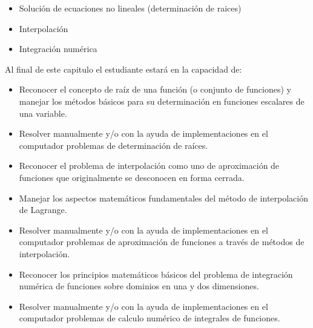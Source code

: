 \begin{itemize}
	\item Solución de ecuaciones no lineales (determinación de raices)
	\item Interpolación
	\item Integración numérica
\end{itemize}

Al final de este capitulo el estudiante estará en la capacidad de:

\begin{itemize}
	\item Reconocer el concepto de raíz de una función (o conjunto de funciones) y manejar los métodos básicos para su determinación en funciones escalares de una variable.
	\item Resolver manualmente y/o con la ayuda de implementaciones en el computador problemas de determinación de raíces.
	\item Reconocer el problema de interpolación como uno de aproximación de funciones que originalmente se desconocen en forma cerrada.
	\item Manejar los aspectos matemáticos fundamentales del método de interpolación de Lagrange.
	\item Resolver manualmente y/o con la ayuda de implementaciones en el computador problemas de aproximación de funciones a través de métodos de interpolación.
	\item Reconocer los principios matemáticos básicos del problema de integración numérica de funciones sobre dominios en una y dos dimensiones.
	\item Resolver manualmente y/o con la ayuda de implementaciones en el computador problemas de calculo numérico de integrales de funciones.
\end{itemize}




